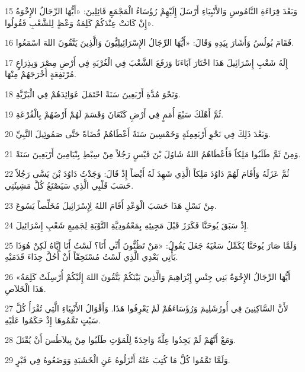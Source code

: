 \par 15 وَبَعْدَ قِرَاءَةِ النَّامُوسِ وَالأَنْبِيَاءِ أَرْسَلَ إِلَيْهِمْ رُؤَسَاءُ الْمَجْمَعِ قَائِلِينَ: «أَيُّهَا الرِّجَالُ الإِخْوَةُ إِنْ كَانَتْ عِنْدَكُمْ كَلِمَةُ وَعْظٍ لِلشَّعْبِ فَقُولُوا».
\par 16 فَقَامَ بُولُسُ وَأَشَارَ بِيَدِهِ وَقَالَ: «أَيُّهَا الرِّجَالُ الإِسْرَائِيلِيُّونَ وَالَّذِينَ يَتَّقُونَ اللهَ اسْمَعُوا.
\par 17 إِلَهُ شَعْبِ إِسْرَائِيلَ هَذَا اخْتَارَ آبَاءَنَا وَرَفَعَ الشَّعْبَ فِي الْغُرْبَةِ فِي أَرْضِ مِصْرَ وَبِذِرَاعٍ مُرْتَفِعَةٍ أَخْرَجَهُمْ مِنْهَا.
\par 18 وَنَحْوَ مُدَّةِ أَرْبَعِينَ سَنَةً احْتَمَلَ عَوَائِدَهُمْ فِي الْبَرِّيَّةِ.
\par 19 ثُمَّ أَهْلَكَ سَبْعَ أُمَمٍ فِي أَرْضِ كَنْعَانَ وَقَسَمَ لَهُمْ أَرْضَهُمْ بِالْقُرْعَةِ.
\par 20 وَبَعْدَ ذَلِكَ فِي نَحْوِ أَرْبَعِمِئَةٍ وَخَمْسِينَ سَنَةً أَعْطَاهُمْ قُضَاةً حَتَّى صَمُوئِيلَ النَّبِيِّ.
\par 21 وَمِنْ ثَمَّ طَلَبُوا مَلِكاً فَأَعْطَاهُمُ اللهُ شَاوُلَ بْنَ قَيْسٍ رَجُلاً مِنْ سِبْطِ بِنْيَامِينَ أَرْبَعِينَ سَنَةً.
\par 22 ثُمَّ عَزَلَهُ وَأَقَامَ لَهُمْ دَاوُدَ مَلِكاً الَّذِي شَهِدَ لَهُ أَيْضاً إِذْ قَالَ: وَجَدْتُ دَاوُدَ بْنَ يَسَّى رَجُلاً حَسَبَ قَلْبِي الَّذِي سَيَصْنَعُ كُلَّ مَشِيئَتِي.
\par 23 مِنْ نَسْلِ هَذَا حَسَبَ الْوَعْدِ أَقَامَ اللهُ لِإِسْرَائِيلَ مُخَلِّصاً يَسُوعَ.
\par 24 إِذْ سَبَقَ يُوحَنَّا فَكَرَزَ قَبْلَ مَجِيئِهِ بِمَعْمُودِيَّةِ التَّوْبَةِ لِجَمِيعِ شَعْبِ إِسْرَائِيلَ.
\par 25 وَلَمَّا صَارَ يُوحَنَّا يُكَمِّلُ سَعْيَهُ جَعَلَ يَقُولُ: «مَنْ تَظُنُّونَ أَنِّي أَنَا؟ لَسْتُ أَنَا إِيَّاهُ لَكِنْ هُوَذَا يَأْتِي بَعْدِي الَّذِي لَسْتُ مُسْتَحِقّاً أَنْ أَحُلَّ حِذَاءَ قَدَمَيْهِ.
\par 26 «أَيُّهَا الرِّجَالُ الإِخْوَةُ بَنِي جِنْسِ إِبْرَاهِيمَ وَالَّذِينَ بَيْنَكُمْ يَتَّقُونَ اللهَ إِلَيْكُمْ أُرْسِلَتْ كَلِمَةُ هَذَا الْخَلاَصِ.
\par 27 لأَنَّ السَّاكِنِينَ فِي أُورُشَلِيمَ وَرُؤَسَاءَهُمْ لَمْ يَعْرِفُوا هَذَا. وَأَقْوَالُ الأَنْبِيَاءِ الَّتِي تُقْرَأُ كُلَّ سَبْتٍ تَمَّمُوهَا إِذْ حَكَمُوا عَلَيْهِ.
\par 28 وَمَعْ أَنَّهُمْ لَمْ يَجِدُوا عِلَّةً وَاحِدَةً لِلْمَوْتِ طَلَبُوا مِنْ بِيلاَطُسَ أَنْ يُقْتَلَ.
\par 29 وَلَمَّا تَمَّمُوا كُلَّ مَا كُتِبَ عَنْهُ أَنْزَلُوهُ عَنِ الْخَشَبَةِ وَوَضَعُوهُ فِي قَبْرٍ.
